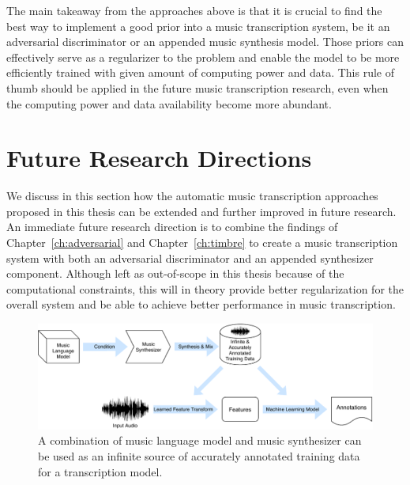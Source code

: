 The main takeaway from the approaches above is that it is crucial to find the best way to implement a good prior into a music transcription system, be it an adversarial discriminator or an appended music synthesis model.
Those priors can effectively serve as a regularizer to the problem and enable the model to be more efficiently trained with given amount of computing power and data.
This rule of thumb should be applied in the future music transcription research, even when the computing power and data availability become more abundant.

\section{Future Research Directions}

We discuss in this section how the automatic music transcription approaches proposed in this thesis can be extended and further improved in future research.
An immediate future research direction is to combine the findings of Chapter~\ref{ch:adversarial} and Chapter~\ref{ch:timbre} to create a music transcription system with both an adversarial discriminator and an appended synthesizer component.
Although left as out-of-scope in this thesis because of the computational constraints, this will in theory provide better regularization for the overall system and be able to achieve better performance in music transcription.


\begin{figure}
	\centering
	\includegraphics[width=\textwidth]{paradigms-5-proposed.pdf}
	\caption{A combination of music language model and music synthesizer can be used as an infinite source of accurately annotated training data for a transcription model.}\label{fig:unlimited-data}
\end{figure}

